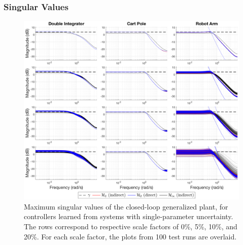 \subsubsection{Singular Values}
\begin{figure}[H]
\centering
	\includegraphics[width=\textwidth]{figures/uncertainty_singular_values3.png}
\caption{Maximum singular values of the closed-loop generalized plant, for controllers learned from systems with single-parameter uncertainty.  The rows correspond to respective scale factors of 0\%, 5\%, 10\%, and 20\%.  For each scale factor, the plots from 100 test runs are overlaid.}
\label{fig:uncertainty_singular_values3}
\end{figure}

\newpage
